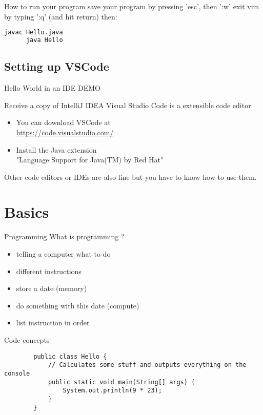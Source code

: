 \begin{frame}[fragile]{How to run your program}
   save your program by pressing 'esc', then ':w'
   exit vim by typing ':q' (and hit return)
   then:
   \begin{lstlisting}[language=bash]
      javac Hello.java
      java Hello
   \end{lstlisting}
\end{frame}

\subsection{Setting up VSCode}

\begin{frame}{Hello World in an IDE}
   DEMO
\end{frame}

\begin{frame}{Receive a copy of IntelliJ IDEA}
  Visual Studio Code is a extensible code editor
  \begin{itemize}
      \item You can download VSCode at  \\
          \url{https://code.visualstudio.com/}
      \item Install the Java extension \\
       "Language Support for Java(TM) by Red Hat"
  \end{itemize}
  Other code editors or IDEs are also fine but you have to know how to use them.
\end{frame}

\section{Basics}

\begin{frame}{Programming}
	What is programming ?
	\begin{itemize}
		\item<1-> telling a computer what to do
		\item<2-> different instructions
		\item<3-> store a date (memory)
		\item<4-> do something with this date (compute)
		\item<5-> list instruction in order
	\end{itemize}
\end{frame}

\begin{frame}[fragile]{Code concepts}
	\begin{lstlisting}
		public class Hello {
			// Calculates some stuff and outputs everything on the console
			public static void main(String[] args) {
				System.out.println(9 * 23);
			}
		}
	\end{lstlisting}
\end{frame}

